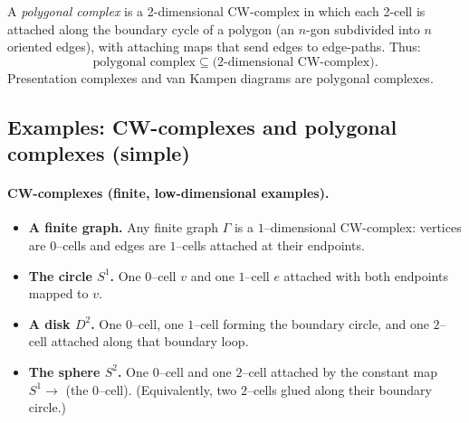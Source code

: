 \documentclass[11pt]{article}
\theoremstyle{definition}
\theoremstyle{plain}
\theoremstyle{remark}
\begin{document}
A \emph{polygonal complex} is a 2-dimensional CW-complex in which each 2-cell is attached along the boundary cycle of a polygon
(an $n$-gon subdivided into $n$ oriented edges), with attaching maps that send edges to edge-paths.
Thus:
\[
\text{polygonal complex} \subseteq \text{(2-dimensional CW-complex)}.
\]
Presentation complexes and van Kampen diagrams are polygonal complexes.


\subsection*{Examples: CW-complexes and polygonal complexes (simple)}

\paragraph{CW-complexes (finite, low-dimensional examples).}
\begin{itemize}[leftmargin=2em]
\item \textbf{A finite graph.}
Any finite graph $\Gamma$ is a $1$--dimensional CW-complex: vertices are $0$--cells and edges are $1$--cells attached at their endpoints.

\item \textbf{The circle $S^1$.}
One $0$--cell $v$ and one $1$--cell $e$ attached with both endpoints mapped to $v$.

\item \textbf{A disk $D^2$.}
One $0$--cell, one $1$--cell forming the boundary circle, and one $2$--cell attached along that boundary loop.

\item \textbf{The sphere $S^2$.}
One $0$--cell and one $2$--cell attached by the constant map $S^1\to$ (the $0$--cell).
(Equivalently, two $2$--cells glued along their boundary circle.)
\end{itemize}
\end{document}
